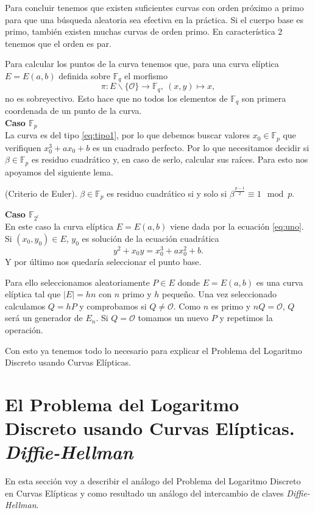 Para concluir tenemos que existen suficientes curvas con orden próximo a primo para que una búsqueda aleatoria sea efectiva en la práctica. Si el cuerpo base es primo, también existen muchas curvas de orden primo. En característica 2 tenemos que el orden es par.

Para calcular los puntos de la curva tenemos que, para una curva elíptica $E=E(a,b)$ definida sobre $\mathbb{F}_q$ el morfismo
$$
	\pi:E\backslash\{\mathcal{O}\}\rightarrow\mathbb{F}_q,\: (x,y)\mapsto x,
$$
no es sobreyectivo. Esto hace que no todos los elementos de $\mathbb{F}_q$ son primera coordenada de un punto de la curva.\\

\textbf{Caso $\mathbb{F}_p$}\\
La curva es del tipo \eqref{eq:tipo1}, por lo que debemos buscar valores $x_0\in \mathbb{F}_p$ que verifiquen $x_0^3+ax_0+b$ es un cuadrado perfecto. Por lo que necesitamos decidir si $\beta\in\mathbb{F}_p$ es residuo cuadrático y, en caso de serlo, calcular sus raíces. Para esto nos apoyamos del siguiente lema. 
\begin{lema}
		(Criterio de Euler). $\beta \in \mathbb{F}_p$ es residuo cuadrático si y solo si $\beta^{\frac{p-1}{2}}\equiv 1 \mod p$.
\end{lema}
\textbf{Caso $\mathbb{F}_{2^l}$}\\
En este caso la curva elíptica $E=E(a,b)$ viene dada por la ecuación \eqref{eq:uno}. Si $(x_0,y_0)\in E$, $y_0$ es solución de la ecuación cuadrática
$$
	y^2+x_0y=x_0^3+ax_0^2+b.
$$
Y por último nos quedaría seleccionar el punto base.

Para ello seleccionamos aleatoriamente $P\in E$ donde $E=E(a,b)$ es una curva elíptica tal que $|E|=hn$ con $n$ primo y $h$ pequeño. Una vez seleccionado calculamos $Q=hP$ y comprobamos si $Q\neq\mathcal{O}$. Como $n$ es primo y $nQ=\mathcal{O}$, $Q$ será un generador de $E_n$. Si $Q=\mathcal{O}$ tomamos un nuevo $P$ y repetimos la operación.

Con esto ya tenemos todo lo necesario para explicar el Problema del Logaritmo Discreto usando Curvas Elípticas.
\section{El Problema del Logaritmo Discreto usando Curvas Elípticas. \emph{Diffie-Hellman}}
En esta sección voy a describir el análogo del Problema del Logaritmo Discreto en Curvas Elípticas y como resultado un análogo del intercambio de claves \emph{Diffie-Hellman}.

